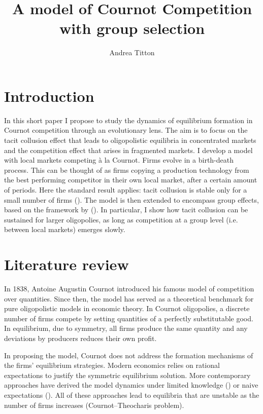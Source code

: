 \documentclass[american]{scrartcl}
\title{A model of Cournot Competition with group selection}
\author{Andrea Titton}
\newcommand{\citein}[1]{\citeauthor{#1} (\citeyear{#1})}
\begin{document}

\maketitle

\section{Introduction}


In this short paper I propose to study the dynamics of equilibrium formation in Cournot competition through an evolutionary lens. The aim is to focus on the tacit collusion effect that leads to oligopolistic equilibria in concentrated markets and the competition effect that arises in fragmented markets. I develop a model with local markets competing à la Cournot. Firms evolve in a birth-death process. This can be thought of as firms copying a production technology from the best performing competitor in their own local market, after a certain amount of periods. Here the standard result applies: tacit collusion is stable only for a small number of firms (\cite{Lampart2012}). The model is then extended to encompass group effects, based on the framework by \citein{Akdeniz2020}. In particular, I show how tacit collusion can be sustained for larger oligopolies, as long as competition at a group level (i.e. between local markets) emerges slowly.

\section{Literature review}

In 1838, Antoine Augustin Cournot introduced his famous model of competition over quantities. Since then, the model has served as a theoretical benchmark for pure oligopolistic models in economic theory. In Cournot oligopolies, a discrete number of firms compete by setting quantities of a perfectly substitutable good. In equilibrium, due to symmetry, all firms produce the same quantity and any deviations by producers reduces their own profit.

In proposing the model, Cournot does not address the formation mechanisms of the firms' equilibrium strategies. Modern economics relies on rational expectations to justify the symmetric equilibrium solution. More contemporary approaches have derived the model dynamics under limited knowledge (\cite{Bischi2015}) or naive expectations (\cite{Cnovas2008}). All of these approaches lead to equilibria that are unstable as the number of firms increases (Cournot–Theocharis problem).
\end{document}
